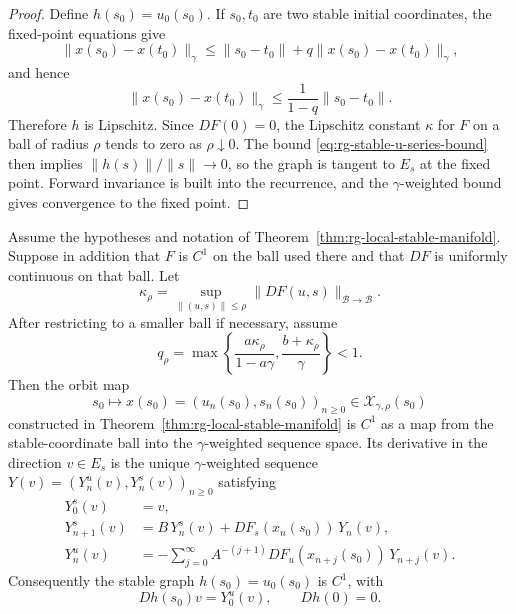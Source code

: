 \begin{proof}
Define \(h(s_0)=u_0(s_0)\).  If \(s_0,t_0\) are two stable initial
coordinates, the fixed-point equations give
\[
  \|x(s_0)-x(t_0)\|_\gamma
  \leq
  \|s_0-t_0\|+q\|x(s_0)-x(t_0)\|_\gamma ,
\]
and hence
\begin{equation}
  \|x(s_0)-x(t_0)\|_\gamma
  \leq
  \frac{1}{1-q}\|s_0-t_0\|.
  \label{eq:rg-stable-graph-lipschitz-bound}
\end{equation}
Therefore \(h\) is Lipschitz.  Since \(DF(0)=0\), the Lipschitz constant
\(\kappa\) for \(F\) on a ball of radius \(\rho\) tends to zero as
\(\rho\downarrow0\).  The bound
\eqref{eq:rg-stable-u-series-bound} then implies
\(\|h(s)\|/\|s\|\to0\), so the graph is tangent to \(E_s\) at the fixed
point.  Forward invariance is built into the recurrence, and the
\(\gamma\)-weighted bound gives convergence to the fixed point.
\end{proof}

\begin{theorem}
\label{thm:rg-c1-stable-graph-criterion}
Assume the hypotheses and notation of
Theorem~\ref{thm:rg-local-stable-manifold}.  Suppose in addition that
\(F\) is \(C^1\) on the ball used there and that \(DF\) is uniformly
continuous on that ball.  Let
\[
  \kappa_\rho
  =
  \sup_{\|(u,s)\|\leq \rho}\|DF(u,s)\|_{\mathcal B\to\mathcal B}.
\]
After restricting to a smaller ball if necessary, assume
\begin{equation}
  q_\rho
  =
  \max\!\left\{
    \frac{a\kappa_\rho}{1-a\gamma},
    \frac{b+\kappa_\rho}{\gamma}
  \right\}
  <1 .
  \label{eq:rg-c1-stable-graph-small-derivative}
\end{equation}
Then the orbit map
\[
  s_0\longmapsto x(s_0)=(u_n(s_0),s_n(s_0))_{n\geq0}
  \in\mathcal X_{\gamma,\rho}(s_0)
\]
constructed in Theorem~\ref{thm:rg-local-stable-manifold} is \(C^1\) as a
map from the stable-coordinate ball into the \(\gamma\)-weighted sequence
space.  Its derivative in the direction \(v\in E_s\) is the unique
\(\gamma\)-weighted sequence \(Y(v)=(Y^u_n(v),Y^s_n(v))_{n\geq0}\) satisfying
\begin{align}
  Y^s_0(v)&=v, \label{eq:rg-c1-stable-derivative-initial}\\
  Y^s_{n+1}(v)
  &=
  B\,Y^s_n(v)
  +
  DF_s(x_n(s_0))\,Y_n(v),                                      \\
  Y^u_n(v)
  &=
  -\sum_{j=0}^{\infty}
  A^{-(j+1)}DF_u(x_{n+j}(s_0))\,Y_{n+j}(v).
  \label{eq:rg-c1-stable-derivative-unstable}
\end{align}
Consequently the stable graph \(h(s_0)=u_0(s_0)\) is \(C^1\), with
\[
  Dh(s_0)v=Y^u_0(v),
  \qquad
  Dh(0)=0 .
\]
\end{theorem}

